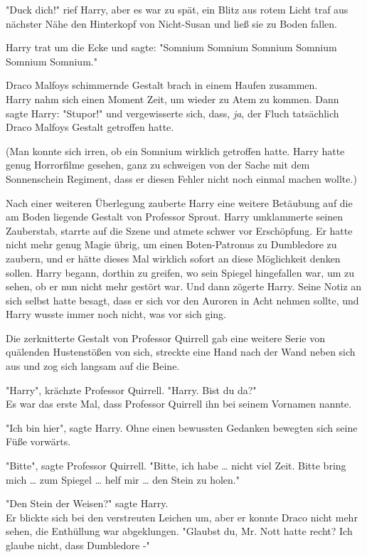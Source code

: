 {"Duck dich!" rief Harry, aber es war zu spät, ein Blitz aus rotem Licht traf aus nächster Nähe den Hinterkopf von Nicht-Susan und ließ sie zu Boden fallen.

Harry trat um die Ecke und sagte: "Somnium Somnium Somnium Somnium Somnium Somnium."

Draco Malfoys schimmernde Gestalt brach in einem Haufen zusammen.\\ Harry nahm sich einen Moment Zeit, um wieder zu Atem zu kommen. Dann sagte Harry: "Stupor!" und vergewisserte sich, dass, \emph{ja}, der Fluch tatsächlich Draco Malfoys Gestalt getroffen hatte.

(Man konnte sich irren, ob ein Somnium wirklich getroffen hatte. Harry hatte genug Horrorfilme gesehen, ganz zu schweigen von der Sache mit dem Sonnenschein Regiment, dass er diesen Fehler nicht noch einmal machen wollte.)

Nach einer weiteren Überlegung zauberte Harry eine weitere Betäubung auf die am Boden liegende Gestalt von Professor Sprout. Harry umklammerte seinen Zauberstab, starrte auf die Szene und atmete schwer vor Erschöpfung. Er hatte nicht mehr genug Magie übrig, um einen Boten-Patronus zu Dumbledore zu zaubern, und er hätte dieses Mal wirklich sofort an diese Möglichkeit denken sollen. Harry begann, dorthin zu greifen, wo sein Spiegel hingefallen war, um zu sehen, ob er nun nicht mehr gestört war. Und dann zögerte Harry. Seine Notiz an sich selbst hatte besagt, dass er sich vor den Auroren in Acht nehmen sollte, und Harry wusste immer noch nicht, was vor sich ging.

Die zerknitterte Gestalt von Professor Quirrell gab eine weitere Serie von quälenden Hustenstößen von sich, streckte eine Hand nach der Wand neben sich aus und zog sich langsam auf die Beine.

"Harry", krächzte Professor Quirrell. "Harry. Bist du da?"\\ Es war das erste Mal, dass Professor Quirrell ihn bei seinem Vornamen nannte.

"Ich bin hier", sagte Harry. Ohne einen bewussten Gedanken bewegten sich seine Füße vorwärts.

"Bitte", sagte Professor Quirrell. "Bitte, ich habe … nicht viel Zeit. Bitte bring mich … zum Spiegel … helf mir … den Stein zu holen."

"Den Stein der Weisen?" sagte Harry.\\ Er blickte sich bei den verstreuten Leichen um, aber er konnte Draco nicht mehr sehen, die Enthüllung war abgeklungen. "Glaubst du, Mr. Nott hatte recht? Ich glaube nicht, dass Dumbledore -"

}

